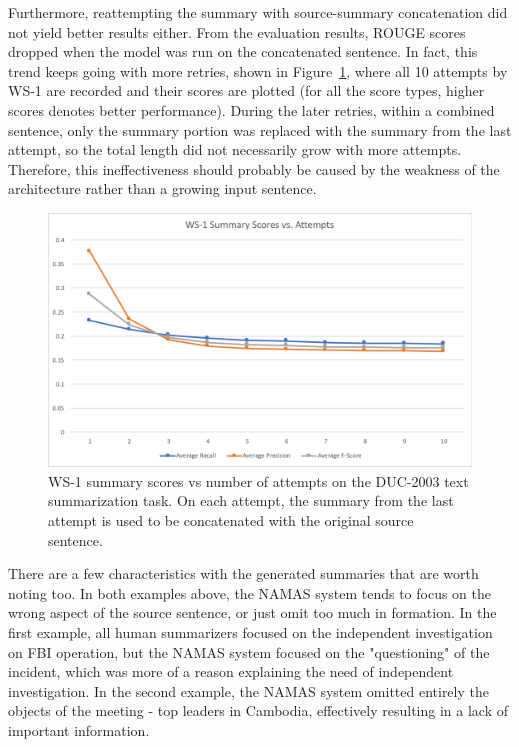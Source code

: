 \documentclass[letterpaper]{article} %
\begin{document}
Furthermore, reattempting the summary with source-summary concatenation did not yield better results either. From the evaluation results, ROUGE scores dropped when the model was run on the concatenated sentence. In fact, this trend keeps going with more retries, shown in Figure~\ref{fig:ws-1scorevsattempts}, where all 10 attempts by WS-1 are recorded and their scores are plotted (for all the score types, higher scores denotes better performance). During the later retries, within a combined sentence, only the summary portion was replaced with the summary from the last attempt, so the total length did not necessarily grow with more attempts. Therefore, this ineffectiveness should probably be caused by the weakness of the architecture rather than a growing input sentence.

\begin{figure}[h]
	\includegraphics[scale=0.26]{ws-1_scores_vs_attempts}
	\centering
	\caption{WS-1 summary scores vs number of attempts on the DUC-2003 text summarization task. On each attempt, the summary from the last attempt is used to be concatenated with the original source sentence.}
	\label{fig:ws-1scorevsattempts}
\end{figure}

There are a few characteristics with the generated summaries that are worth noting too. In both examples above, the NAMAS system tends to focus on the wrong aspect of the source sentence, or just omit too much in formation. In the first example, all human summarizers focused on the independent investigation on FBI operation, but the NAMAS system focused on the "questioning" of the incident, which was more of a reason explaining the need of independent investigation. In the second example, the NAMAS system omitted entirely the objects of the meeting - top leaders in Cambodia, effectively resulting in a lack of important information.
\end{document}
